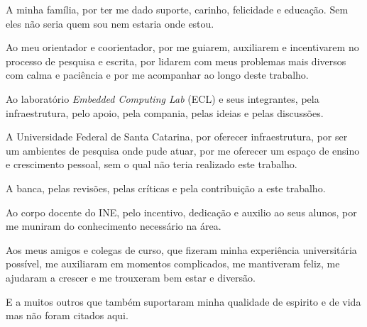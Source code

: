 \documentclass[
	12pt,				%
	openright,			%
	twoside,			%
	a4paper,			%
	english,			%
	brazil,				%
	]{abntex2}
\begin{document}
\frenchspacing 


\imprimircapa

\imprimirfolhaderosto*


%
% 
%
%	  

\begin{agradecimentos}
A minha família, por ter me dado suporte, carinho, felicidade e educação. Sem eles não seria quem sou nem estaria onde estou.

Ao meu orientador e coorientador, por me guiarem, auxiliarem e incentivarem no processo de pesquisa e escrita, por lidarem com meus problemas mais diversos com calma e paciência e por me acompanhar ao longo deste trabalho.

Ao laboratório \textit{Embedded Computing Lab} (ECL) e seus integrantes, pela infraestrutura, pelo apoio, pela compania, pelas ideias e pelas discussões.

A Universidade Federal de Santa Catarina, por oferecer infraestrutura, por ser um ambientes de pesquisa onde pude atuar, por me oferecer um espaço de ensino e crescimento pessoal, sem o qual não teria realizado este trabalho.

A banca, pelas revisões, pelas críticas e pela contribuição a este trabalho.

Ao corpo docente do INE, pelo incentivo, dedicação e auxilio ao seus alunos, por me muniram do conhecimento necessário na área.

Aos meus amigos e colegas de curso, que fizeram minha experiência universitária possível, me auxiliaram em momentos complicados, me mantiveram feliz, me ajudaram a crescer e me trouxeram bem estar e diversão.

E a muitos outros que também suportaram minha qualidade de espirito e de vida mas não foram citados aqui.
\end{agradecimentos}
\end{document}
